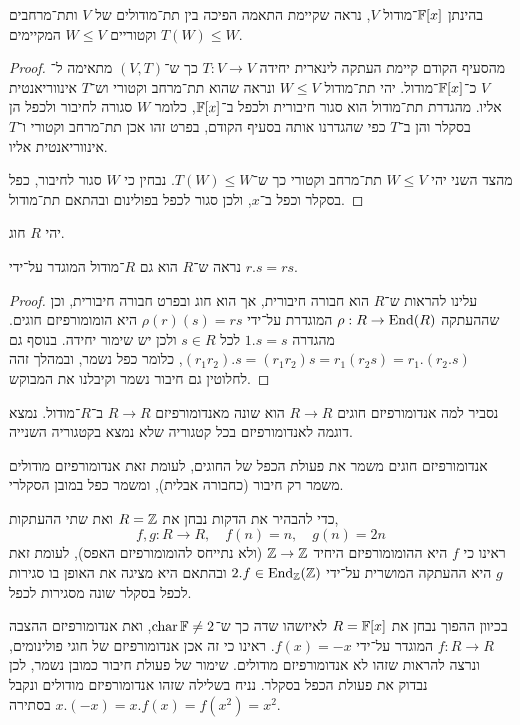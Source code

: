 \subquestion{}
בהינתן $\mathbb{F}[x]$־מודול $V$, נראה שקיימת התאמה הפיכה בין תת־מודולים של $V$ ותת־מרחבים וקטוריים $W \le V$ המקיימים $T(W) \le W$.
\begin{proof}
	מהסעיף הקודם קיימת העתקה לינארית יחידה $T : V \to V$ כך ש־$(V, T)$ מתאימה ל־$V$ כ־$\mathbb{F}[x]$־מודול.
	יהי תת־מודול $W \le V$ ונראה שהוא תת־מרחב וקטורי וש־$T$ אינווריאנטית אליו.
	מהגדרת תת־מודול הוא סגור חיבורית ולכפל ב־$\mathbb{F}[x]$, כלומר $W$ סגורה לחיבור ולכפל הן בסקלר והן ב־$T$ כפי שהגדרנו אותה בסעיף הקודם, בפרט זהו אכן תת־מרחב וקטורי ו־$T$ אינווריאנטית אליו.

	מהצד השני יהי $W \le V$ תת־מרחב וקטורי כך ש־$T(W) \le W$.
	נבחין כי $W$ סגור לחיבור, כפל בסקלר וכפל ב־$x$, ולכן סגור לכפל בפולינום ובהתאם תת־מודול.
\end{proof}

\question{}
יהי $R$ חוג.

\subquestion{}
נראה ש־$R$ הוא גם $R$־מודול המוגדר על־ידי $r . s = r s$.
\begin{proof}
	עלינו להראות ש־$R$ הוא חבורה חיבורית, אך הוא חוג ובפרט חבורה חיבורית, וכן שההעתקה $\rho : R \to \operatorname{End}(R)$ המוגדרת על־ידי $\rho(r)(s) = r s$ היא הומומורפיזם חוגים.
	מהגדרה $1 . s = s$ לכל $s \in R$ ולכן יש שימור יחידה.
	בנוסף גם $(r_1 r_2) . s = (r_1 r_2) s = r_1 (r_2 s) = r_1 . (r_2 . s)$, כלומר כפל נשמר, ובמהלך זהה לחלוטין גם חיבור נשמר וקיבלנו את המבוקש.
\end{proof}

\subquestion{}
נסביר למה אנדומורפיזם חוגים $R \to R$ הוא שונה מאנדומורפיזם $R \to R$ ב־$R$־מודול.
נמצא דוגמה לאנדומורפיזם בכל קטגוריה שלא נמצא בקטגוריה השנייה.
\begin{solution}
	אנדומורפיזם חוגים משמר את פעולת הכפל של החוגים, לעומת זאת אנדומורפיזם מודולים משמר רק חיבור (כחבורה אבלית), ומשמר כפל במובן הסקלרי.

	כדי להבהיר את הדקות נבחן את $R = \mathbb{Z}$ ואת שתי ההעתקות,
	\[
		f, g : R \to R,
		\quad
		f(n) = n,
		\quad
		g(n) = 2 n
	\]
	ראינו כי $f$ היא ההומומורפיזם היחיד $\mathbb{Z} \to \mathbb{Z}$ (ולא נתייחס להומומורפיזם האפס), לעומת זאת $g$ היא ההעתקה המושרית על־ידי $2 . f \in \operatorname{End}_{\mathbb{Z}}(\mathbb{Z})$ ובהתאם היא מציגה את האופן בו סגירות לכפל בסקלר שונה מסגירות לכפל.

	בכיוון ההפוך נבחן את $R = \mathbb{F}[x]$ לאיזשהו שדה כך ש־$\operatorname{char} \mathbb{F} \ne 2$, ואת אנדומורפיזם ההצבה $f : R \to R$ המוגדר על־ידי $f(x) = -x$.
	ראינו כי זה אכן אנדומורפיזם של חוגי פולינומים, ונרצה להראות שזהו לא אנדומורפיזם מודולים.
	שימור של פעולת חיבור כמובן נשמר, לכן נבדוק את פעולת הכפל בסקלר.
	נניח בשלילה שזהו אנדומורפיזם מודולים ונקבל $x . (-x) = x . f(x) = f(x^2) = x^2$ בסתירה.
\end{solution}


